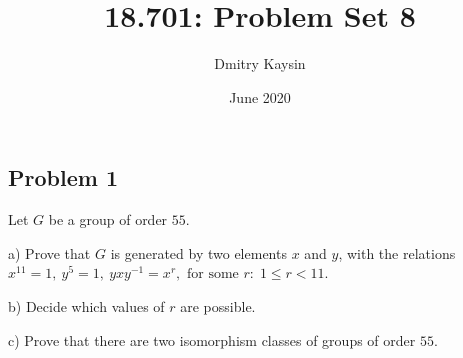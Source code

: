 \documentclass{article}
\title{18.701: Problem Set 8}
\author{Dmitry Kaysin}
\date{June 2020}
\theoremstyle{definition}
\begin{document}
\maketitle 


\subsection*{Problem 1}

\begin{tcolorbox}
Let $G$ be a group of order $55$.

a) Prove that $G$ is generated by two elements $x$ and $y$, with the relations $x^{11}=1, \> y^5=1, \> yxy^{-1}=x^r, \text{ for some $r: \; 1 \leq r < 11$}$.

b) Decide which values of $r$ are possible.

c) Prove that there are two isomorphism classes of groups of order $55$.
\end{tcolorbox}
\end{document}
